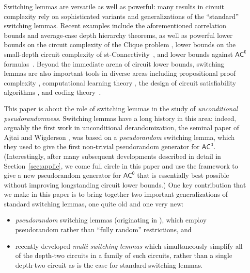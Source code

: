 \documentclass[11pt]{article}
\numberwithin{equation}{section}
\theoremstyle{definition}
\theoremstyle{plain}
\theoremstyle{plain}
\newcommand{\acz}{\mathsf{AC^0}}
\begin{document}
Switching lemmas are versatile as well as powerful:  many results in circuit complexity rely on sophisticated variants and generalizations of the ``standard'' switching lemmas.  Recent examples include
the aforementioned correlation bounds and average-case depth hierarchy theorems, as well as powerful lower bounds on the circuit complexity of the {\sc Clique} problem \cite{Beame90,Rossman08}, lower bounds on the small-depth circuit complexity of {\sc st-Connectivity}~\cite{COST16}, and lower bounds against $\acz$ formulas~\cite{Rossman18}. Beyond the immediate arena of circuit lower bounds, switching lemmas are also important tools in diverse areas including propositional proof complexity \cite{PBI93,KPW94,PRST16,Hastad17}, computational learning theory \cite{LMN:93},  the design of circuit satisfiability algorithms \cite{BIS12,IMP12}, and coding theory~\cite{CL17,BDGMT18}.

This paper is about the role of switching lemmas in the study of \emph{unconditional pseudorandomness}.  Switching lemmas have a long history in this area; indeed, arguably the first work in unconditional derandomization, the seminal paper of Ajtai and Wigderson \cite{AjtaiWigderson:85}, was based on a \emph{pseudorandom} switching lemma, which they used to give the first non-trivial pseudorandom generator for $\acz$.  (Interestingly, after many subsequent developments described in detail in Section~\ref{sec:applic}, we come full circle in this paper and use the \cite{AjtaiWigderson:85} framework to give a new pseudorandom generator for $\acz$ that is essentially best possible without improving longstanding circuit lower bounds.)  One key contribution that we make in this paper is to bring together two important generalizations of standard switching lemmas, one quite old and one very new:

\begin{itemize}

\item [(i)] \emph{pseudorandom} switching lemmas (originating in \cite{AjtaiWigderson:85}), which employ pseudorandom rather than ``fully random'' restrictions, and 

\item [(ii)] recently developed \emph{multi-switching lemmas} \cite{IMP12,Has14} which simultaneously simplify all of the depth-two circuits in a family of such circuits, rather than a single depth-two circuit as is the case for standard switching lemmas.

\end{itemize}
\end{document}
